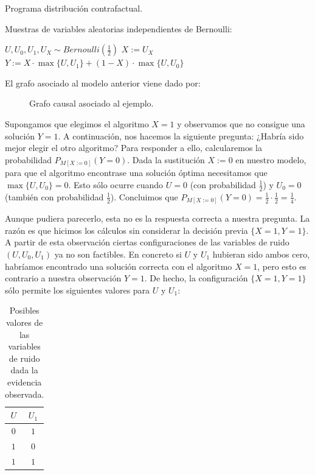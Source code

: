 \documentclass[oneside,openright,titlepage,numbers=noenddot,openany,headinclude,footinclude=true,
cleardoublepage=empty,abstractoff,BCOR=5mm,paper=a4,fontsize=12pt,main=spanish]{scrreprt}
\begin{document}
\clearpage

\begin{algorithm}[h]
\caption{Programa distribución contrafactual.}
    Muestras de variables aleatorias independientes de Bernoulli: 
    
    $U,U_0,U_1,U_X \sim  Bernoulli\left(\frac{1}{2}\right)$\;
    $X:=U_X$\;
    $Y:=X \cdot \max\{U,U_1\}+(1-X)\cdot \max\{U,U_0\}$ \;
    \label{alg:programa 4}
\end{algorithm}

El grafo asociado al modelo anterior viene dado por:

\begin{figure}[h]
\centering
{}
\caption{Grafo causal asociado al ejemplo.}
\end{figure}

Supongamos que elegimos el algoritmo $X = 1$ y observamos que no consigue una solución $Y = 1$. A continuación, nos hacemos la siguiente pregunta: ¿Habría sido mejor elegir el otro algoritmo? Para responder a ello, calcularemos la probabilidad $P_{M[X:=0]}(Y = 0)$. Dada la sustitución $X := 0$ en nuestro modelo, para que el algoritmo encontrase una solución óptima necesitamos que $\max\{U, U_0\} = 0$. Esto sólo ocurre cuando $U=0$ (con probabilidad $\frac{1}{2}$) y $U_0=0$ (también con probabilidad $\frac{1}{2}$). Concluimos que $P_{M[X:=0]}(Y = 0)=\frac{1}{2}\cdot \frac{1}{2}=\frac{1}{4}$.

Aunque pudiera parecerlo, esta no es la respuesta correcta a nuestra pregunta. La razón es que hicimos los cálculos sin considerar la decisión previa $\{X = 1, Y = 1\}$. A partir de esta observación ciertas configuraciones de las variables de ruido $(U, U_0, U_1)$ ya no son factibles. En concreto si $U$ y $U_1$ hubieran sido ambos cero, habríamos encontrado una solución correcta con el algoritmo $X = 1$, pero esto es contrario a nuestra observación $Y=1$. De hecho, la configuración $\{X = 1, Y = 1\}$ sólo permite los siguientes valores para $U$ y $U_1$:

\begin{table}[h]
\centering
\resizebox{2.0cm}{!} {
\begin{tabular}{cc}
\hline
$U$ & $U_1$ \\ \hline
$0$ & $1$   \\
$1$ & $0$   \\
$1$ & $1$   \\ \hline
\end{tabular}
}
\caption{Posibles valores de las variables de ruido dada la evidencia observada.}
\end{table}
\end{document}
